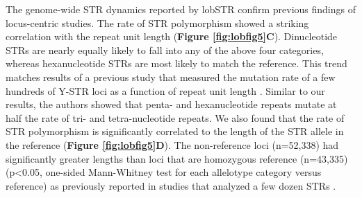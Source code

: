 The genome-wide STR dynamics reported by lobSTR confirm previous findings of locus-centric studies. The rate of STR polymorphism showed a striking correlation with the repeat unit length (\textbf{Figure \ref{fig:lobfig5}C}). Dinucleotide STRs are nearly equally likely to fall into any of the above four categories, whereas hexanucleotide STRs are most likely to match the reference. This trend matches results of a previous study that measured the mutation rate of a few hundreds of Y-STR loci as a function of repeat unit length \cite{JarveZhivotovskyRootsiEtAl2009}.  Similar to our results, the authors showed that penta- and hexanucleotide repeats mutate at half the rate of tri- and tetra-nucleotide repeats. We also found that the rate of STR polymorphism is significantly correlated to the length of the STR allele in the reference (\textbf{Figure \ref{fig:lobfig5}D}). The non-reference loci (n=52,338) had significantly greater lengths than loci that are homozygous reference (n=43,335) (p<0.05, one-sided Mann-Whitney test for each allelotype category versus reference) as previously reported in studies that analyzed a few dozen STRs \cite{BrinkmannKlintscharNeuhuberEtAl1998,Ellegren2000}. 

